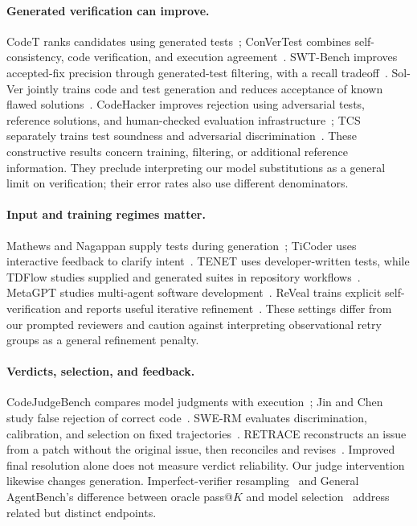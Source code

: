 \paragraph{Generated verification can improve.}
CodeT ranks candidates using generated tests~\cite{chen2023codet}; ConVerTest combines
self-consistency, code verification, and execution agreement~\cite{convertest2026}.
SWT-Bench improves accepted-fix precision through generated-test filtering, with a recall
tradeoff~\cite{mundler2024swtbench}. Sol-Ver jointly trains code and test generation and
reduces acceptance of known flawed solutions~\cite{lin2025solver}. CodeHacker improves
rejection using adversarial tests, reference solutions, and human-checked evaluation
infrastructure~\cite{shi2026codehacker}; TCS separately trains test soundness and
adversarial discrimination~\cite{xu2026tcs}. These constructive results concern training,
filtering, or additional reference information. They preclude interpreting our model
substitutions as a general limit on verification; their error rates also use different
denominators.

\paragraph{Input and training regimes matter.}
Mathews and Nagappan supply tests during generation~\cite{mathews2024tdd}; TiCoder uses
interactive feedback to clarify intent~\cite{fakhoury2024ticoder}. TENET uses
developer-written tests, while TDFlow studies supplied and generated suites in repository
workflows~\cite{sun2025tenet,tdflow2025}. MetaGPT studies multi-agent software
development~\cite{hong2024metagpt}. ReVeal trains explicit self-verification and reports
useful iterative refinement~\cite{jin2025reveal}. These settings differ from our prompted
reviewers and caution against interpreting observational retry groups as a general
refinement penalty.

\paragraph{Verdicts, selection, and feedback.}
CodeJudgeBench compares model judgments with execution~\cite{jiang2025codejudgebench};
Jin and Chen study false rejection of correct code~\cite{verifyfailures2025}.
SWE-RM evaluates discrimination, calibration, and selection on fixed
trajectories~\cite{shum2025swerm}. RETRACE reconstructs an issue from a patch without
the original issue, then reconciles and revises~\cite{li2026retrace}. Improved final
resolution alone does not measure verdict reliability. Our judge intervention likewise
changes generation. Imperfect-verifier resampling~\cite{stroebl2026resampling} and
General AgentBench's difference between oracle pass@$K$ and model selection~\cite{li2026generalagentbench}
address related but distinct endpoints.

